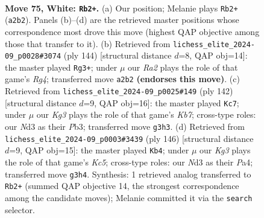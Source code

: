 \documentclass[11pt]{article}
\begin{document}
\clearpage

\begin{figure}[p]\centering
\begin{subfigure}{0.46\textwidth}\centering
\resizebox{\linewidth}{!}{%
\newchessgame
\chessboard[
  setfen={8/8/1k6/8/8/3N2K1/R5P1/3r4 w - - 14 75},
  showmover=false,
  pgfstyle=straightmove, color=movearrow, markmove={a2-b2}
]}
\caption{}
\end{subfigure}\hfill
\begin{subfigure}{0.46\textwidth}\centering
\resizebox{\linewidth}{!}{%
\newchessgame
\chessboard[
  setfen={8/8/7K/5N1P/6R1/1k6/5r2/8 w - - 13 73},
  showmover=false,
  pgfstyle=straightmove, color=movearrow, markmove={g4-g3}
]}
\caption{}
\end{subfigure}
\\[4pt]
\begin{subfigure}{0.46\textwidth}\centering
\resizebox{\linewidth}{!}{%
\newchessgame
\chessboard[
  setfen={8/1K6/1P6/3k4/8/rP3p2/8/1R6 w - - 1 72},
  showmover=false,
  pgfstyle=straightmove, color=movearrow, markmove={b7-c7}
]}
\caption{}
\end{subfigure}\hfill
\begin{subfigure}{0.46\textwidth}\centering
\resizebox{\linewidth}{!}{%
\newchessgame
\chessboard[
  setfen={8/1k6/7R/2K5/P1P5/r7/8/8 w - - 1 74},
  showmover=false,
  pgfstyle=straightmove, color=movearrow, markmove={c5-b4}
]}
\caption{}
\end{subfigure}
\caption{\textbf{Move 75, White: \texttt{Rb2+}.} (a) Our position; Melanie plays \texttt{Rb2+} (\texttt{a2b2}). Panels (b)--(d) are the retrieved master positions whose correspondence most drove this move (highest QAP objective among those that transfer to it). (b) Retrieved from \texttt{lichess\_elite\_2024-09\_p0028\#3074} (ply 144) [structural distance $d$=8, QAP obj=14]: the master played \texttt{Rg3+}; under $\mu$ our \emph{Ra2} plays the role of that game's \emph{Rg4}; transferred move \texttt{a2b2} \textbf{(endorses this move)}. (c) Retrieved from \texttt{lichess\_elite\_2024-09\_p0025\#149} (ply 142) [structural distance $d$=9, QAP obj=16]: the master played \texttt{Kc7}; under $\mu$ our \emph{Kg3} plays the role of that game's \emph{Kb7}; cross-type roles: our \emph{N}d3 as their \emph{P}b3; transferred move \texttt{g3h3}. (d) Retrieved from \texttt{lichess\_elite\_2024-09\_p0003\#3439} (ply 146) [structural distance $d$=9, QAP obj=15]: the master played \texttt{Kb4}; under $\mu$ our \emph{Kg3} plays the role of that game's \emph{Kc5}; cross-type roles: our \emph{N}d3 as their \emph{P}a4; transferred move \texttt{g3h4}. Synthesis: 1 retrieved analog transferred to \texttt{Rb2+} (summed QAP objective 14, the strongest correspondence among the candidate moves); Melanie committed it via the \texttt{search} selector.}
\label{fig:thought-m148}
\end{figure}
\end{document}
